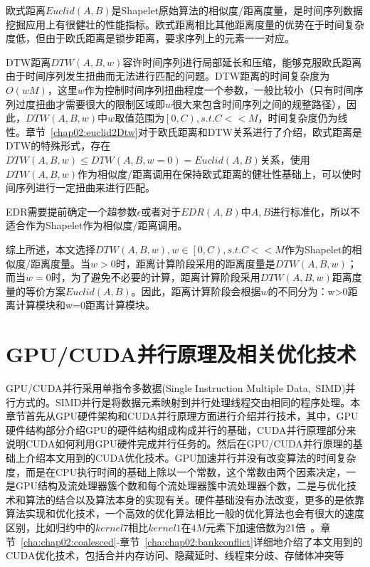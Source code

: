 欧式距离$Euclid(A,B)$是Shapelet原始算法的相似度/距离度量，是时间序列数据挖掘应用上有很健壮的性能指标。欧式距离相比其他距离度量的优势在于时间复杂度低，但由于欧氏距离是锁步距离，要求序列上的元素一一对应。

DTW距离$DTW(A,B,w)$容许时间序列进行局部延长和压缩，能够克服欧氏距离由于时间序列发生扭曲而无法进行匹配的问题。DTW距离的时间复杂度为$O(wM)$，这里$w$作为控制时间序列扭曲程度一个参数，一般比较小（只有时间序列过度扭曲才需要很大的限制区域即$w$很大来包含时间序列之间的规整路径），因此，$DTW(A,B,w)$中$w$取值范围为$\left[ 0,C\right),s.t. C << M $，时间复杂度仍为线性。章节~\ref{chap02:euclid2Dtw}对于欧氏距离和DTW关系进行了介绍，欧式距离是DTW的特殊形式，存在$DTW(A,B,w)\leq DTW(A,B,w=0) = Euclid(A,B)$关系，使用$DTW(A,B,w)$作为相似度/距离调用在保持欧式距离的健壮性基础上，可以使时间序列进行一定扭曲来进行匹配。

EDR需要提前确定一个超参数$\epsilon$或者对于$EDR(A,B)$中$A,B$进行标准化，所以不适合作为Shapelet作为相似度/距离调用。

综上所述，本文选择$DTW(A,B,w),w\in \left[0,C\right),s.t. C << M$作为Shapelet的相似度/距离度量。当$w>0$时，距离计算阶段采用的距离度量是$DTW(A,B,w)$；而当$w=0$时，为了避免不必要的计算，距离计算阶段采用$DTW(A,B,w)$距离度量的等价方案$Euclid(A,B)$。因此，距离计算阶段会根据$w$的不同分为：w>0距离计算模块和w=0距离计算模块。


\section{GPU/CUDA并行原理及相关优化技术}
\label{cha:chap03:gpu-HW-Arch}

GPU/CUDA并行采用单指令多数据(Single Instruction Multiple Data,~SIMD)并行方式的。SIMD并行是将数据元素映射到并行处理线程交由相同的程序处理。本章节首先从GPU硬件架构和CUDA并行原理方面进行介绍并行技术，其中，GPU硬件结构部分介绍GPU的硬件结构组成构成并行的基础，CUDA并行原理部分来说明CUDA如何利用GPU硬件完成并行任务的。然后在GPU/CUDA并行原理的基础上介绍本文用到的CUDA优化技术。GPU加速并行并没有改变算法的时间复杂度，而是在CPU执行时间的基础上除以一个常数，这个常数由两个因素决定，一是GPU结构及流处理器簇个数和每个流处理器簇中流处理器个数，二是与优化技术和算法的结合以及算法本身的实现有关。硬件基础没有办法改变，更多的是依靠算法实现和优化技术，一个高效的优化算法相比一般的优化算法也会有很大的速度区别，比如归约中的$kernel7$相比$kernel1$在$4M$元素下加速倍数为21倍~\cite{harris2007optimizing}。章节~\ref{cha:chap02:coalesced}-章节~\ref{cha:chap02:bankconflict}详细地介绍了本文用到的CUDA优化技术，包括合并内存访问、隐藏延时、线程束分歧、存储体冲突等

